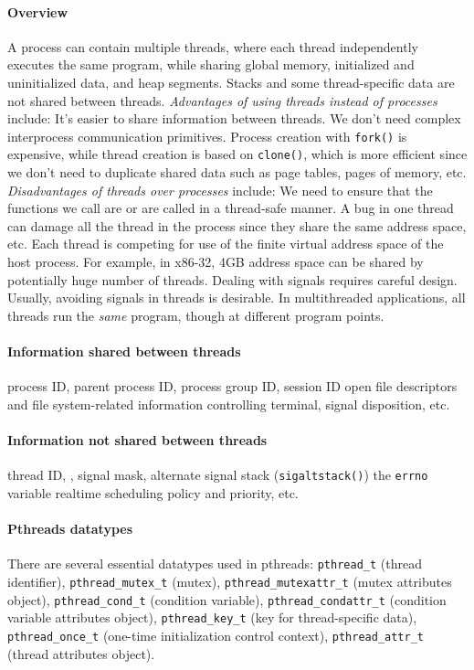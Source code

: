 \documentclass{memo}
\begin{document}
\small
{}

\paragraph{Overview} 
A process can contain multiple threads, where each thread independently
executes the same program, while sharing global memory, initialized and
uninitialized data, and heap segments. Stacks and some thread-specific data
are not shared between threads. 
{\em Advantages of using threads instead of processes\/} include:
\bit
\w It's easier to share information between threads. We don't need complex
interprocess communication primitives.
\w Process creation with \verb+fork()+ is expensive, while thread creation is
based on \verb+clone()+, which is more efficient since we don't need to
duplicate shared data such as page tables, pages of memory, etc.
\eit
{\em Disadvantages of threads over processes} include:
\bit
\w We need to ensure that the functions we call are  or are
called in a thread-safe manner.
\w A bug in one thread can damage all the thread in the process since they
share the same address space, etc.
\w Each thread is competing for use of the finite virtual address space of the
host process. For example, in x86-32, 4GB address space can be shared by
potentially huge number of threads.
\w Dealing with signals requires careful design. Usually, avoiding signals in
threads is desirable. 
\w In multithreaded applications, all threads run the {\em same\/} program,
though at  different program points.
\eit

\paragraph{Information shared between threads}
\bit
\w process ID, parent process ID, process group ID, session ID
\w {}
\w open file descriptors and file system-related information
\w controlling terminal, signal disposition, etc.
\eit

\paragraph{Information not shared between threads}
\bit
\w thread ID, , 
\w signal mask, alternate signal stack (\verb+sigaltstack()+)
\w the {\tt errno} variable
\w realtime scheduling policy and priority, etc.
\eit

\paragraph{Pthreads datatypes} There are several essential datatypes used in
pthreads: \verb+pthread_t+ (thread identifier), 
\verb+pthread_mutex_t+ (mutex),
\verb+pthread_mutexattr_t+ (mutex attributes object),
\verb+pthread_cond_t+ (condition variable),
\verb+pthread_condattr_t+ (condition variable attributes object),
\verb+pthread_key_t+ (key for thread-specific data),
\verb+pthread_once_t+ (one-time initialization control context),
\verb+pthread_attr_t+ (thread attributes object).
\end{document}
